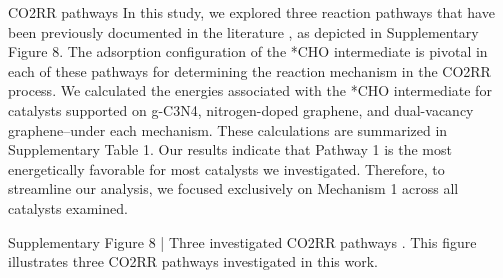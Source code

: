 CO2RR pathways
In this study, we explored three reaction pathways that have been previously documented in the literature \cite{durand2011structure, nie2014reaction, peterson2010copper}, as depicted in Supplementary Figure 8. The adsorption configuration of the *CHO intermediate is pivotal in each of these pathways for determining the reaction mechanism in the CO2RR process. We calculated the energies associated with the *CHO intermediate for catalysts supported on g-C3N4, nitrogen-doped graphene, and dual-vacancy graphene–under each mechanism. These calculations are summarized in Supplementary Table 1. Our results indicate that Pathway 1 is the most energetically favorable for most catalysts we investigated. Therefore, to streamline our analysis, we focused exclusively on Mechanism 1 across all catalysts examined.

Supplementary Figure 8 | Three investigated CO2RR pathways \cite{durand2011structure, nie2014reaction, peterson2010copper}. This figure illustrates three CO2RR pathways investigated in this work.

